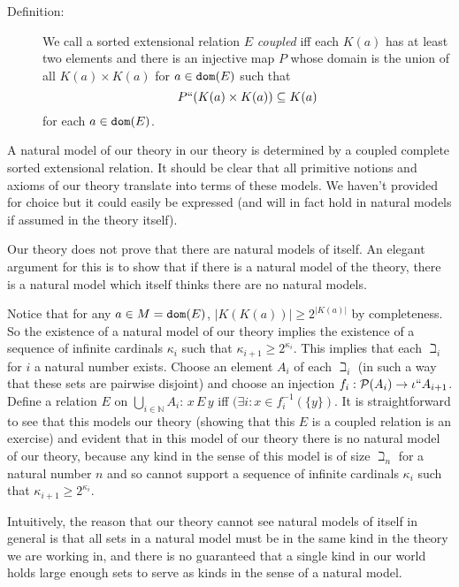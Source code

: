\documentclass[12pt]{article}
\begin{document}
\begin{description}

\item[Definition:]  We call a sorted extensional relation $E$ {\em coupled} iff each $K(a)$ has at least two elements and there is an injective map $P$ whose domain is the union of all $K(a) \times K(a)$ for $a \in {\tt dom}(E)$ such that $$P``(K(a) \times K(a)) \subseteq K(a)$$ for each $a \in {\tt dom}(E)$.

\end{description}

A natural model of our theory in our theory is determined by a coupled complete sorted extensional relation.  It should be clear that all primitive notions and axioms of our theory translate into terms of these models.  We haven't provided for choice but it could easily be expressed (and will in fact hold in natural models if assumed in the theory itself).

Our theory does not prove that there are natural models of itself.  An elegant argument for this is to show that if there is a natural model of the theory, there is a natural model which itself thinks there are no natural models.

Notice that for any $a \in M = {\tt dom}(E)$, $|K(K(a))| \geq 2^{|K(a)|}$ by completeness.  So the existence of a natural model of our theory implies the existence of a sequence of infinite cardinals $\kappa_i$ such that $\kappa_{i+1} \geq 2^{\kappa_i}$.  This implies that each $\beth_i$ for $i$ a natural number exists.
Choose an element $A_i$ of each $\beth_i$ (in such a way that these sets are pairwise disjoint) and choose an injection $f_i:{\cal P}(A_i) \rightarrow \iota``A_{i+1}$.  Define a relation $E$ on $\bigcup_{i \in \mathbb N}A_i$:  $x \,E\,y$ iff $(\exists i:x \in f_{i}^{-1}(\{y\})$.  It is straightforward to see that this models our
theory (showing that this $E$ is a coupled relation is an exercise) and evident that in this model of our theory there is no natural model of our theory, because any kind in the sense of this model is of size $\beth_n$ for a natural number $n$ and so cannot support a sequence of infinite cardinals $\kappa_i$ such that $\kappa_{i+1} \geq 2^{\kappa_i}$. 

Intuitively, the reason that our theory cannot see natural models of itself in general is that all sets in a natural model must be in the same kind in the theory we are working in, and there is no guaranteed that a single kind in our world holds large enough sets to serve as kinds in the sense of a natural model.
\end{document}
